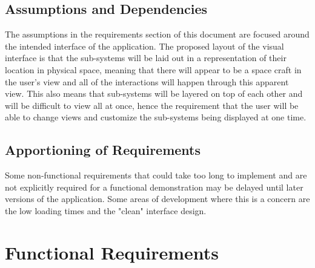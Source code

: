 \documentclass[12pt, titlepage]{article}
\newcommand\tab[1][1cm]{\hspace*{#1}}
\begin{document}
\subsection{Assumptions and Dependencies}
\tab The assumptions in the requirements section of this document are focused around the intended interface of the application. The proposed layout of the visual interface is that the sub-systems will be laid out in a representation of their location in physical space, meaning that there will appear to be a space craft in the user's view and all of the interactions will happen through this apparent view. This also means that sub-systems will be layered on top of each other and will be difficult to view all at once, hence the requirement that the user will be able to change views and customize the sub-systems being displayed at one time.

\subsection{Apportioning of Requirements}
\tab Some non-functional requirements that could take too long to implement and are not explicitly required for a functional demonstration may be delayed until later versions of the application. Some areas of development where this is a concern are the low loading times and the "clean" interface design.

\section{Functional Requirements}
\label{sec:functional_requirements}
\end{document}
